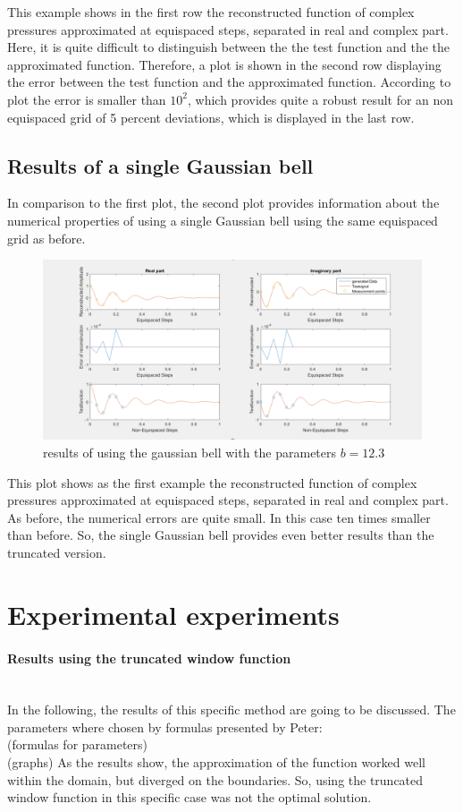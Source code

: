 \documentclass[11pt]{report} %
\begin{document}
This example shows in the first row the reconstructed function of complex pressures approximated at equispaced steps, separated in real and complex part. 
Here, it is quite difficult to distinguish between the the test function and the the approximated function. 
Therefore, a plot is shown in the second row displaying the error between the test function and the approximated function. 
According to plot the error is smaller than $10^2$, which provides quite a robust result for an non equispaced grid of 5 percent deviations, which is displayed in the last row.


\subsection{Results of a single Gaussian bell}
In comparison to the first plot, the second plot provides information about the numerical properties of using a single Gaussian bell using the same equispaced grid as before.

\begin{figure}[H]
\centering
\includegraphics[scale=0.8]{./Figures/plot_trunc}
\caption{results of using the gaussian bell with the parameters $b=12.3$}
\end{figure}

This plot shows as the first example the reconstructed function of complex pressures approximated at equispaced steps, separated in real and complex part.
As before, the numerical errors are quite small.
In this case ten times smaller than before. 
So, the single Gaussian bell provides even better results than the truncated version. 


\section{Experimental experiments}
\paragraph{Results using the truncated window function} $ $ \\[1ex]
In the following, the results of this specific method are going to be discussed.
The parameters where chosen by formulas presented by Peter: \\
	(formulas for parameters) \\
	(graphs)
As the results show, the approximation of the function worked well within the domain, but diverged on the boundaries.
So, using the truncated window function in this specific case was not the optimal solution. \\[1ex]
\end{document}
